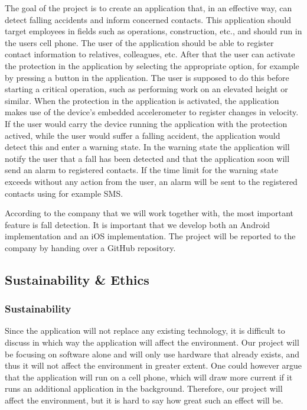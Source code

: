 \documentclass[12pt, a4paper, onecolumn]{article}
\begin{document}
		The goal of the project is to create an application that, in an effective way, can detect falling accidents and inform concerned contacts. This application should target employees in fields such as operations, construction, etc., and should run in the users cell phone. The user of the application should be able to register contact information to relatives, colleagues, etc. After that the user can activate the protection in the application by selecting the appropriate option, for example by pressing a button in the application. The user is supposed to do this before starting a critical operation, such as performing work on an elevated height or similar. When the protection in the application is activated, the application makes use of the device's embedded accelerometer to register changes in velocity. If the user would carry the device running the application with the protection actived, while the user would suffer a falling accident, the application would detect this and enter a warning state. In the warning state the application will notify the user that a fall has been detected and that the application soon will send an alarm to registered contacts. If the time limit for the warning state exceeds without any action from the user, an alarm will be sent to the registered contacts using for example SMS.
		
		According to the company that we will work together with, the most important feature is fall detection. It is important that we develop both an Android implementation and an iOS implementation. The project will be reported to the company by handing over a GitHub repository.
		
		
		\subsection{Sustainability \& Ethics}
		
		\subsubsection{Sustainability}
		
		Since the application will not replace any existing technology, it is difficult to discuss in which way the application will affect the environment. Our project will be focusing on software alone and will only use hardware that already exists, and thus it will not affect the environment in greater extent. One could however argue that the application will run on a cell phone, which will draw more current if it runs an additional application in the background. Therefore, our project will affect the environment, but it is hard to say how great such an effect will be.
		
\end{document}
